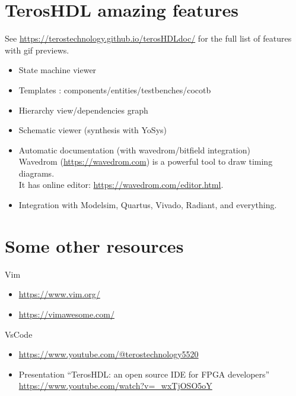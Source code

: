 \documentclass[aspectratio=169]{beamer}
\begin{document}
\section*{TerosHDL amazing features}
\begin{frame}{\secname}

  See \url{https://terostechnology.github.io/terosHDLdoc/} for the full list of features
  with gif previews.

  \begin{itemize}
    \item State machine viewer
    \item Templates : components/entities/testbenches/cocotb
    \item Hierarchy view/dependencies graph
    \item Schematic viewer (synthesis with YoSys)
    \item Automatic documentation (with wavedrom/bitfield integration) \\
      Wavedrom (\url{https://wavedrom.com}) is a powerful tool to draw timing diagrams.\\
      It has online editor: \url{https://wavedrom.com/editor.html}.
    \item Integration with Modelsim, Quartus, Vivado, Radiant, and everything.
  \end{itemize}
    
\end{frame}

\section*{Some other resources}
\begin{frame}{\secname}
  \begin{block}{Vim}
    \begin{itemize}
      \item \url{https://www.vim.org/}
      \item \url{https://vimawesome.com/}
    \end{itemize}
  \end{block}

  \begin{block}{VsCode}
    \begin{itemize}
      \item \url{https://www.youtube.com/@terostechnology5520}
      \item Presentation ``TerosHDL: an open source IDE for FPGA developers'' \url{https://www.youtube.com/watch?v=_wxTjOSO5oY}
    \end{itemize}
  \end{block}
  	
\end{frame}
\end{document}
